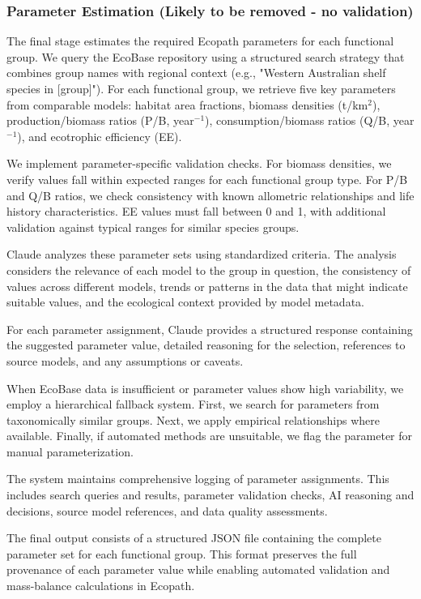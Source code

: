 \subsubsection{Parameter Estimation (Likely to be removed - no validation)}

The final stage estimates the required Ecopath \citep{Christensen2004} parameters for each functional group. We query the EcoBase repository \citep{Colleter2015} using a structured search strategy that combines group names with regional context (e.g., "Western Australian shelf species in [group]"). For each functional group, we retrieve five key parameters from comparable models: habitat area fractions, biomass densities (t/km$^2$), production/biomass ratios (P/B, year$^{-1}$), consumption/biomass ratios (Q/B, year$^{-1}$), and ecotrophic efficiency (EE).

We implement parameter-specific validation checks. For biomass densities, we verify values fall within expected ranges for each functional group type. For P/B and Q/B ratios, we check consistency with known allometric relationships and life history characteristics. EE values must fall between 0 and 1, with additional validation against typical ranges for similar species groups.

Claude \citep{Anthropic2024} analyzes these parameter sets using standardized criteria. The analysis considers the relevance of each model to the group in question, the consistency of values across different models, trends or patterns in the data that might indicate suitable values, and the ecological context provided by model metadata.

For each parameter assignment, Claude provides a structured response containing the suggested parameter value, detailed reasoning for the selection, references to source models, and any assumptions or caveats.

When EcoBase data is insufficient or parameter values show high variability, we employ a hierarchical fallback system. First, we search for parameters from taxonomically similar groups. Next, we apply empirical relationships where available. Finally, if automated methods are unsuitable, we flag the parameter for manual parameterization.

The system maintains comprehensive logging of parameter assignments. This includes search queries and results, parameter validation checks, AI reasoning and decisions, source model references, and data quality assessments.

The final output consists of a structured JSON file containing the complete parameter set for each functional group. This format preserves the full provenance of each parameter value while enabling automated validation and mass-balance calculations in Ecopath.
